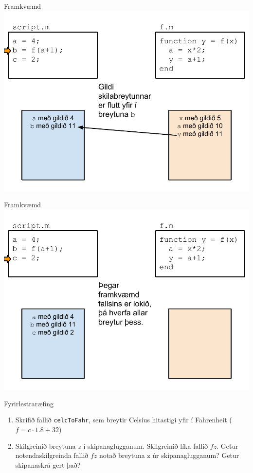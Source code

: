 \documentclass{beamer}
\begin{document}
\begin{frame}{Framkvæmd}
\includegraphics[width=\textwidth]{Pics/framkvaemd-falls-6}
\end{frame}
\begin{frame}{Framkvæmd}
\includegraphics[width=\textwidth]{Pics/framkvaemd-falls-7}
\end{frame}

\begin{frame}{Fyrirlestraræfing}
\begin{enumerate}
 \item Skrifið fallið \texttt{celcToFahr}, sem breytir Celsíus hitastigi yfir í Fahrenheit ($f = c\cdot1.8 + 32$)
 \item Skilgreinið breytuna $z$ í skipanaglugganum. Skilgreinið líka fallið $fz$. Getur notendaskilgreinda fallið $fz$ notað breytuna z úr skipanaglugganum? Getur skipanaskrá gert það?
\end{enumerate}
\end{frame}
\end{document}
